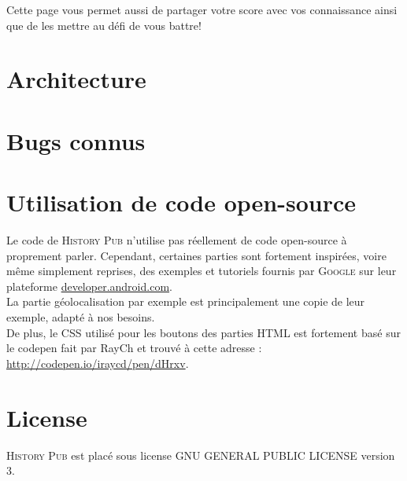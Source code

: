 \documentclass[11pt]{scrreprt}
\begin{document}
    Cette page vous permet aussi de partager votre score avec vos connaissance ainsi que de les mettre au défi de vous battre!

    \chapter{Architecture}

    \chapter{Bugs connus}

    \chapter{Utilisation de code open-source}
    Le code de \textsc{History Pub} n'utilise pas réellement de code open-source à proprement parler. Cependant, certaines parties sont fortement inspirées, voire même simplement reprises, des exemples et tutoriels fournis par \textsc{Google} sur leur plateforme \url{developer.android.com}.\\

    La partie géolocalisation par exemple est principalement une copie de leur exemple, adapté à nos besoins.\\

    De plus, le CSS utilisé pour les boutons des parties HTML est fortement basé sur le codepen fait par RayCh et trouvé à cette adresse : \url{http://codepen.io/iraycd/pen/dHrxv}.

    \chapter{License}

    \noindent \textsc{History Pub} est placé sous license GNU GENERAL PUBLIC LICENSE version 3.
    \hfill\\
\end{document}
